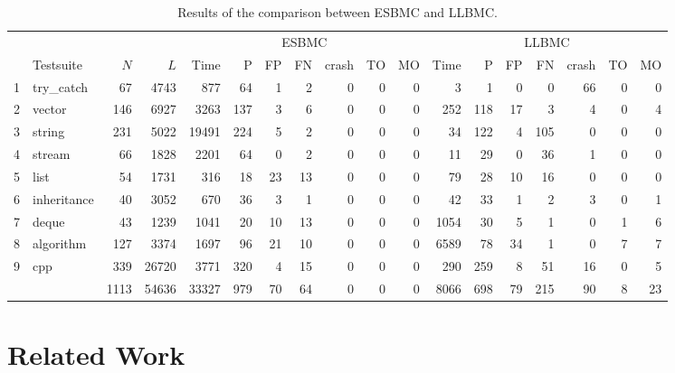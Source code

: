 \documentclass[a4paper]{llncs}
\begin{document}
\begin{table}[t]
\renewcommand\arraystretch{1.18}
\setlength{\tabcolsep}{4pt}
\begin{center} {\small
\begin{tabular}{|c|l|r|r||r|r|r|r|r|r|r|r|r|r|r|r|r|r|}
\hline
  & & & & \multicolumn{7}{c|}{ESBMC} & \multicolumn{7}{c|}{LLBMC} \\  \cline{5-18}
  & Testsuite & $N$ & $L$ & Time & P   & FP  & FN  & crash & TO  & MO & Time & P   & FP  & FN  & crash & TO  & MO \\\hline
1 & try\_catch & 67 & 4743 & 877 & 64 & 1 & 2 & 0 & 0 & 0 & 3 & 1 & 0 & 0 & 66 & 0 & 0 \\
\hline
2 & vector & 146 & 6927 & 3263 & 137 & 3 & 6 & 0 & 0 & 0  & 252 & 118 & 17 & 3 & 4 & 0 & 4\\
\hline
3 & string & 231 & 5022 & 19491 & 224& 5 & 2 & 0 & 0 & 0 & 34 & 122 & 4 & 105 & 0 & 0 & 0\\
\hline
4 & stream & 66 & 1828 & 2201 & 64 & 0 & 2 & 0 & 0 & 0 & 11 & 29 & 0 & 36 & 1 & 0 & 0\\
\hline
5 & list & 54 & 1731 & 316 & 18 & 23 & 13 & 0 & 0 & 0 & 79 & 28 & 10 & 16 & 0 & 0 & 0\\
\hline
6 & inheritance & 40 & 3052 & 670 & 36 & 3 & 1 & 0 & 0 & 0 & 42 & 33 & 1 & 2 & 3 & 0 & 1\\
\hline
7 & deque & 43 & 1239 & 1041 & 20 & 10 & 13 & 0 & 0 & 0 & 1054 & 30 & 5 & 1 & 0 & 1 & 6\\
\hline
8 & algorithm & 127 & 3374 & 1697 & 96 & 21 & 10 & 0 & 0 & 0 & 6589 & 78 & 34 & 1 & 0 & 7 & 7\\
\hline
9 & cpp & 339 & 26720 & 3771 & 320 & 4 & 15 & 0 & 0 & 0 & 290 & 259 & 8 & 51 & 16 & 0 & 5\\
\hline\hline
  &     &  1113 & 54636 & 33327 & 979 & 70 & 64 & 0 & 0 & 0 & 8066 & 698 & 79 & 215 & 90 & 8 & 23 \\
\hline
\end{tabular} }
\end{center}
\caption{Results of the comparison between ESBMC and LLBMC.}
\label{table:results-of-the-comparison-between-ESBMC-and-LLBMC}
\end{table}




\section{Related Work}
\end{document}

